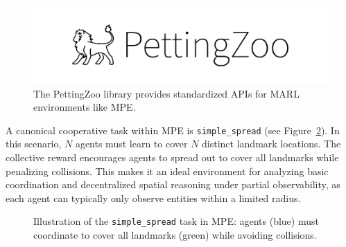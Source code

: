 \documentclass[../Main.tex]{subfiles}
\begin{document}
\begin{figure}[H]
    \centering
    \includegraphics[width=0.4\linewidth]{img/logo/petting-zoo.png}
    \caption{The PettingZoo library provides standardized APIs for MARL environments like MPE.}
    \label{fig:petting_zoo_logo}
\end{figure}

A canonical cooperative task within MPE is \texttt{simple\_spread} (see Figure~\ref{fig:mpe_simple_spread}). In this scenario, \(N\) agents must learn to cover \(N\) distinct landmark locations. The collective reward encourages agents to spread out to cover all landmarks while penalizing collisions. This makes it an ideal environment for analyzing basic coordination and decentralized spatial reasoning under partial observability, as each agent can typically only observe entities within a limited radius.

\begin{figure}[H]
\centering
{}
\caption{Illustration of the \texttt{simple\_spread} task in MPE: agents (blue) must coordinate to cover all landmarks (green) while avoiding collisions.}
\label{fig:mpe_simple_spread}
\end{figure}
\end{document}
